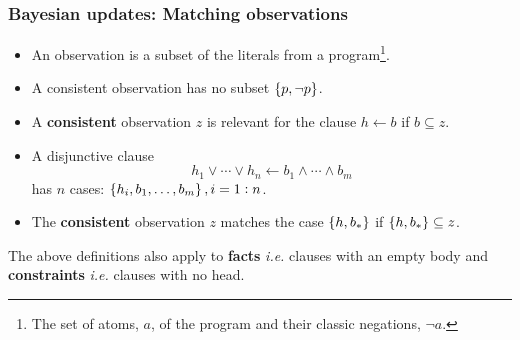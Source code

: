 \documentclass[bigger]{beamer}
\begin{document}
    \begin{frame}
        \frametitle{Bayesian updates: Matching observations}

        \begin{itemize}
            \item An \alert{observation} is a subset of the literals from a program\footnote{The set of atoms, $a$, of the program and their classic negations, $\neg a$.}.
            \item A \alert{consistent} observation has no subset $\set{p, \neg p}$.
            \item A \textbf{consistent} observation $z$ is \alert{relevant} for the clause $h \leftarrow b$ if $b \subseteq z$.
            \item A disjunctive clause $$h_1 \vee \cdots \vee h_n \leftarrow b_1 \wedge \cdots \wedge b_m$$ has $n$ \alert{cases}: $\set{h_i, b_1, \ldots, b_m}, i = 1:n$.
            \item The \textbf{consistent} observation $z$ \alert{matches} the case $\set{h, b_\ast}$ if 
            $\set{h, b_\ast} \subseteq z$.     
        \end{itemize}
        The above definitions also apply to \textbf{facts} \emph{i.e.} clauses with an empty body and \textbf{constraints} \emph{i.e.} clauses with no head.
    \end{frame}
\end{document}
